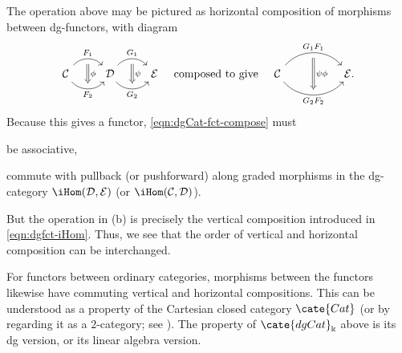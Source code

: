 \begin{remark}
	The operation above may be pictured as horizontal composition of
	morphisms between dg-functors, with diagram
	\[ \begin{tikzcd}
		\mathcal{C} \arrow[bend left=50, r, "F_1", ""' name=LU] \arrow[bend right=50, r, "" name=LD, "F_2"'] &
		\mathcal{D} \arrow[bend left=50, r, "G_1", ""' name=RU] \arrow[bend right=50, r, "" name=RD, "G_2"'] &
		\arrow[Rightarrow, to path=(LU) -- (LD) \tikztonodes, "\phi"] \arrow[Rightarrow, to path=(RU) -- (RD) \tikztonodes, "\psi"] \mathcal{E}
	\end{tikzcd} \quad \text{composed to give} \quad \begin{tikzcd}
		\mathcal{C}
		\arrow[bend left=50, rr, "G_1 F_1", ""' name=U]
		\arrow[bend right=50, rr, "" name=D, "G_2 F_2"']
		& & \arrow[Rightarrow, to path=(U) -- (D) \tikztonodes, "\psi \phi"] \mathcal{E} .
	\end{tikzcd} \]
	Because this gives a functor, \eqref{eqn:dgCat-fct-compose} must
	\begin{inparaenum}[(a)]
		\item be associative,
		\item commute with pullback (or pushforward) along graded morphisms in
		the dg-category $\iHom(\mathcal{D},\mathcal{E})$ (or
		$\iHom(\mathcal{C},\mathcal{D})$).
	\end{inparaenum}
	But the operation in (b) is precisely the vertical composition introduced
	in \eqref{eqn:dgfct-iHom}. Thus, we see that the order of vertical and
	horizontal composition can be interchanged.

	For functors between ordinary categories, morphisms between the functors
	likewise have commuting vertical and horizontal compositions. This can be
	understood as a property of the Cartesian closed category $\cate{Cat}$ (or
	by regarding it as a $2$-category; see \cite[Example 3.5.3]{Li1}). The
	property of $\cate{dgCat}_{\Bbbk}$ above is its dg version, or its linear
	algebra version.
\end{remark}
